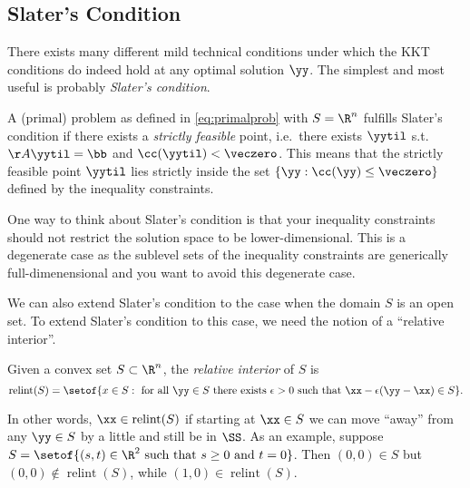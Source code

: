 \subsection{Slater's Condition}
There exists many different mild technical conditions under which the
KKT conditions do indeed hold at any optimal solution $\yy$.
The simplest and most useful is probably \emph{Slater's condition}.

\begin{definition} \label{def:slater}
A (primal) problem as defined in \eqref{eq:primalprob} with $S = \R^n$ fulfills
Slater's condition if there exists a \emph{strictly feasible} point,
i.e.\ there exists $\yytil$ s.t.\ $\AA\yytil = \bb$ and $\cc(\yytil) <
\veczero$.
This means that the strictly feasible point $\yytil$ lies strictly inside the set $\{\yy : \cc(\yy) \leq \veczero\}$ defined by the inequality constraints.
\end{definition}

One way to think about Slater's condition is that your inequality
constraints should not restrict the solution space to be
lower-dimensional. This is a degenerate case as the sublevel sets of
the inequality constraints are generically full-dimenensional and you
want to avoid this degenerate case.

We can also extend Slater's condition to the case when the domain $S$
is an open set.
To extend Slater's condition to this case, we need the notion of a ``relative interior''.


\begin{definition} \label{def:relint}
  Given a convex set $S \subset \R^n$, the \emph{relative interior} of $S$ is
  \[
    \operatorname{relint}(S) = \setof{x \in S : \text{ for all } \yy
      \in S \text{ there exists } \epsilon > 0 \text{ such that }
      \xx - \epsilon(\yy - \xx) \in S}
    .
  \]
\end{definition}
In other words, $\xx \in \operatorname{relint}(S)$ if starting at $\xx
\in S$ we can move
``away'' from any $\yy \in S$ by a little and still be in $\SS$.
As an example, suppose $S = \setof{(s,t) \in \R^2 \text{ such that } s
  \geq 0 \text{ and } t = 0}$.
Then $(0,0) \in S$ but $(0,0) \not\in \operatorname{relint}(S)$, while
$(1,0) \in \operatorname{relint}(S)$.

